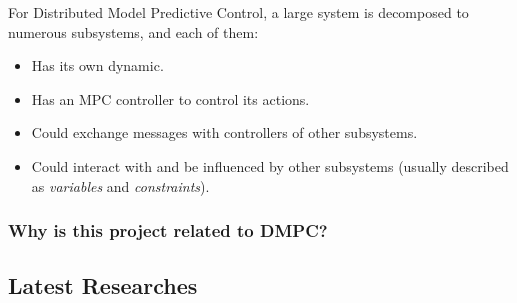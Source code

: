 For Distributed Model Predictive Control, a large system is decomposed to numerous subsystems, and each of them:
\begin{itemize}
  \item Has its own dynamic.
  \item Has an MPC controller to control its actions.
  \item Could exchange messages with controllers of other subsystems.
  \item Could interact with and be influenced by other subsystems (usually described as \textit{variables} and \textit{constraints}).
\end{itemize}

\subsubsection{Why is this project related to DMPC?}
\subsection{Latest Researches}


